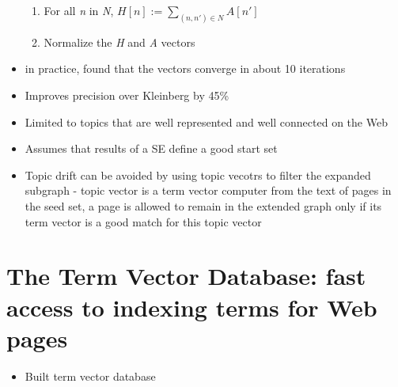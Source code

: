 \documentclass[11pt]{report}
\begin{document}
\begin{itemize}
\begin{enumerate}
\item For all \textit{n} in \textit{N}, $H[n]:=\sum_{(n,n')\in N} A[n']$
\item Normalize the \textit{H} and \textit{A} vectors
\end{enumerate}
\item in practice, found that the vectors converge in about 10 iterations
\item Improves precision over Kleinberg by 45\%
\item Limited to topics that are well represented and well connected on the Web
\item Assumes that results of a SE define a good start set
\item Topic drift can be avoided by using topic vecotrs to filter the expanded subgraph - topic vector is a term vector computer from the text of pages in the seed set, a page is allowed to remain in the extended graph only if its term vector is a good match for this topic vector
\end{itemize}
\section{The Term Vector Database: fast access to indexing terms for Web pages}
\begin{itemize}
\item Built term vector database
\end{itemize}
\end{document}
